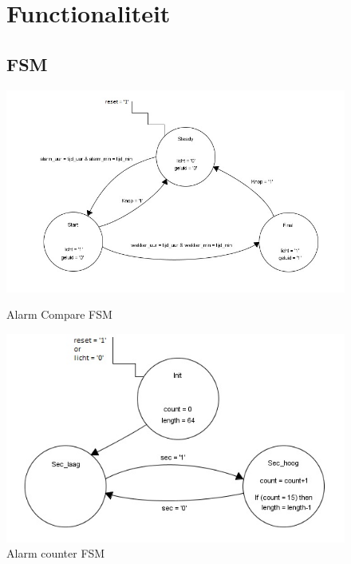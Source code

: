 \begin{figure}
\section{Functionaliteit}
\subsection{FSM}
\includegraphics[width=\textwidth,height=\textheight,keepaspectratio]{Figuren/Alarm/FSM_compare.jpg}
\caption{Alarm Compare FSM}
\includegraphics[width=\textwidth,height=\textheight,keepaspectratio]{Figuren/Alarm/FSM_count.jpg}
\caption{Alarm counter FSM}
\end{figure}
